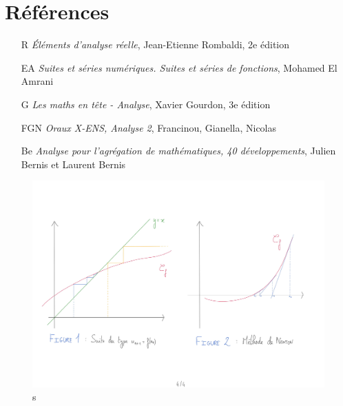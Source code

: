 \documentclass[10pt, a4paper, parskip=full, twoside, twocolumn]{report}
\begin{document}
\section*{Références}
\begin{itemize}	
	\item[R] \emph{Éléments d'analyse réelle}, Jean-Etienne Rombaldi, 2e édition
	\item[EA] \emph{Suites et séries numériques. Suites et séries de fonctions}, Mohamed El Amrani
	\item[G] \emph{Les maths en tête - Analyse}, Xavier Gourdon, 3e édition 
	\item[FGN] \emph{Oraux X-ENS, Analyse 2}, Francinou, Gianella, Nicolas
	\item[Be] \emph{Analyse pour l'agrégation de mathématiques, 40 développements}, Julien Bernis et Laurent Bernis
\end{itemize}

\begin{figure}[!htb]
	\centering
	\includegraphics[trim={0 0 0 0},clip,width=1\linewidth]{img/223.pdf}
	\caption{s}
\end{figure}
\end{document}
